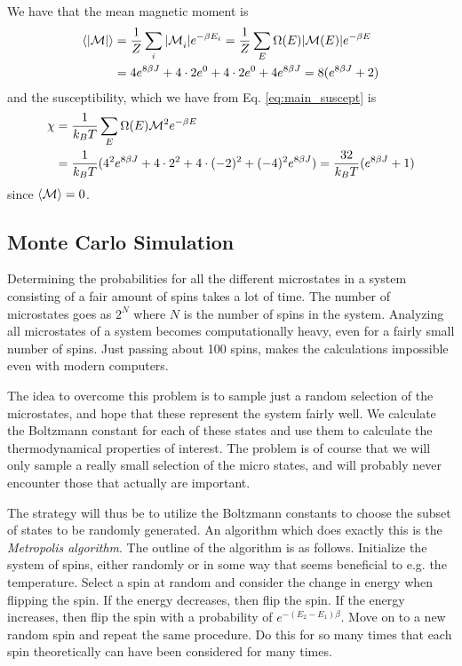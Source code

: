 \documentclass[11pt, a4paper]{article}
\begin{document}
We have that the mean magnetic moment is
\begin{gather}
\begin{aligned}
\braket{|\cal M|} &= \frac{1}{Z}\sum\limits_{i}{|\cal M}_i|e^{-\beta E_i} = \frac{1}{Z}\sum\limits_{E}\Omega(E)|{\cal M}(E)|e^{-\beta E}\\
 &= 4e^{8\beta J} + 4\cdot2e^0 + 4\cdot2e^0 + 4e^{8\beta J} = 8(e^{8\beta J} +2)
 \end{aligned}
\end{gather}
and the susceptibility, which we have from Eq. \eqref{eq:main_suscept} is
\begin{gather}
\begin{aligned}
\chi &= \frac{1}{k_BT}\sum\limits_E \Omega(E){\cal M}^2e^{-\beta E}\\
 &= \frac{1}{k_BT}(4^2e^{8\beta J} + 4\cdot2^2 + 4\cdot(-2)^2 + (-4)^2e^{8\beta J}) = \frac{32}{k_BT}(e^{8\beta J}+1)
 \end{aligned}
\end{gather}
since $\braket{\cal M} = 0$.


\subsection{Monte Carlo Simulation}
Determining the probabilities for all the different microstates in a system consisting of a fair amount of spins takes a lot of time. The number of microstates goes as $2^N$ where $N$ is the number of spins in the system. Analyzing all microstates of a system becomes computationally heavy, even for a fairly small number of spins. Just passing about 100 spins, makes the calculations impossible even with modern computers. 

The idea to overcome this problem is to sample just a random selection of the microstates, and hope that these represent the system fairly well. We calculate the Boltzmann constant for each of these states and use them to calculate the thermodynamical properties of interest. The problem is of course that we will only sample a really small selection of the micro states, and will probably never encounter those that actually are important. 

The strategy will thus be to utilize the Boltzmann constants to choose the subset of states to be randomly generated. An algorithm which does exactly this is the \textit{Metropolis algorithm}. The outline of the algorithm is as follows. Initialize the system of spins, either randomly or in some way that seems beneficial to e.g. the temperature. Select a spin at random and consider the change in energy when flipping the spin. If the energy decreases, then flip the spin. If the energy increases, then flip the spin with a probability of $e^{-(E_2-E_1)\beta}$. Move on to a new random spin and repeat the same procedure. Do this for so many times that each spin theoretically can have been considered for many times.
\end{document}
